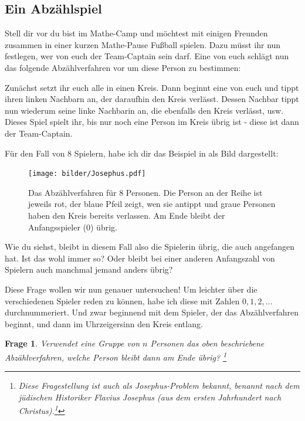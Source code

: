 \documentclass[a4paper,ngerman,12pt]{scrartcl}
\theoremstyle{definition}
\theoremstyle{plain}
\newtheorem{frage}[defn]{Frage}
\theoremstyle{remark}
\begin{document}
\subsection{Ein Abzählspiel}

Stell dir vor du bist im Mathe-Camp und möchtest mit einigen Freunden zusammen in einer kurzen Mathe-Pause Fußball spielen. Dazu müsst ihr nun festlegen, wer von euch der Team-Captain sein darf. Eine von euch schlägt nun das folgende Abzählverfahren vor um diese Person zu bestimmen:

Zunächst setzt ihr euch alle in einen Kreis. Dann beginnt eine von euch und tippt ihren linken Nachbarn an, der daraufhin den Kreis verlässt. Dessen Nachbar tippt nun wiederum seine linke Nachbarin an, die ebenfalls den Kreis verlässt, usw. Dieses Spiel spielt ihr, bis nur noch eine Person im Kreis übrig ist - diese ist dann der Team-Captain.

Für den Fall von $8$ Spielern, habe ich dir das Beispiel in  als Bild dargestellt:

\begin{figure}[h]\centering
	\texttt{[image: bilder/Josephus.pdf]}
	\caption{Das Abzählverfahren für $8$ Personen. Die Person an der Reihe ist jeweils rot, der blaue Pfeil zeigt, wen sie antippt und graue Personen haben den Kreis bereits verlassen. Am Ende bleibt der Anfangsspieler ($0$) übrig.}
	\label{Abb:JosephusBsp}
\end{figure}

Wie du siehst, bleibt in diesem Fall also die Spielerin übrig, die auch angefangen hat. Ist das wohl immer so? Oder bleibt bei einer anderen Anfangszahl von Spielern auch manchmal jemand anders übrig? 

Diese Frage wollen wir nun genauer untersuchen! Um leichter über die verschiedenen Spieler reden zu können, habe ich diese mit Zahlen $0, 1, 2, \dots$ durchnummeriert. Und zwar beginnend mit dem Spieler, der das Abzählverfahren beginnt, und dann im Uhrzeigersinn den Kreis entlang.

\begin{frage}
	Verwendet eine Gruppe von $n$ Personen das oben beschriebene Abzählverfahren, welche Person bleibt dann am Ende übrig?
	\footnote{Diese Fragestellung ist auch als Josephus-Problem bekannt, benannt nach dem jüdischen Historiker Flavius Josephus (aus dem ersten Jahrhundert nach Christus).\footnote{Hilfe}}
\end{frage}
\end{document}
